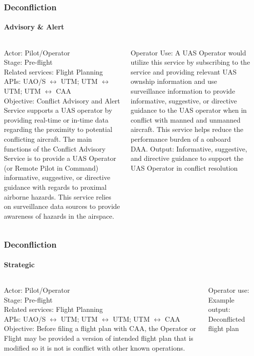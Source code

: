 \documentclass[usenames,dvipsnames,aspectratio=169,serif]{beamer}
\begin{document}
\begin{frame}
   \frametitle{Deconfliction}
   \framesubtitle{Advisory \& Alert}
   \begin{columns}[t]
      \begin{column}{0.5\textwidth}
         Actor: Pilot/Operator \\
         Stage: Pre-flight \\
         Related services: Flight Planning \\
         APIs: UAO/S $\leftrightarrow$ UTM; UTM $\leftrightarrow$ UTM; UTM $\leftrightarrow$ CAA \\
         Objective: Conflict Advisory and Alert Service supports a UAS operator by providing real-time or in-time data regarding the proximity to potential conflicting aircraft. The main functions of the Conflict Advisory Service is to provide a UAS Operator (or Remote Pilot in Command) informative, suggestive, or directive guidance with regards to proximal airborne hazards. This service relies on surveillance data sources to provide awareness of hazards in the airspace.
      \end{column}
      \begin{column}{0.5\textwidth}
         Operator Use: A UAS Operator would utilize this service by subscribing to the service and providing relevant UAS ownship information and use surveillance information to provide informative, suggestive, or directive guidance to the UAS operator when in conflict with manned and unmanned aircraft. This service helps reduce the performance burden of a onboard DAA.
         Output: Informative, suggestive, and directive guidance to support the UAS Operator in conflict resolution
      \end{column}
   \end{columns}
\end{frame}


\begin{frame}
   \frametitle{Deconfliction}
   \framesubtitle{Strategic}
   \begin{columns}[t]
      \begin{column}{0.5\textwidth}
         Actor: Pilot/Operator \\
         Stage: Pre-flight \\
         Related services: Flight Planning \\
         APIs: UAO/S $\leftrightarrow$ UTM; UTM $\leftrightarrow$ UTM; UTM $\leftrightarrow$ CAA \\

         Objective: Before filing a flight plan with CAA, the Operator or Flight may be provided a version of intended flight plan that is modified so it is not is conflict with other known operations.
      \end{column}
      \begin{column}{0.5\textwidth}

         Operator use: \\
         Example output: Deconflicted flight plan
      \end{column}
   \end{columns}
\end{frame}
\end{document}

